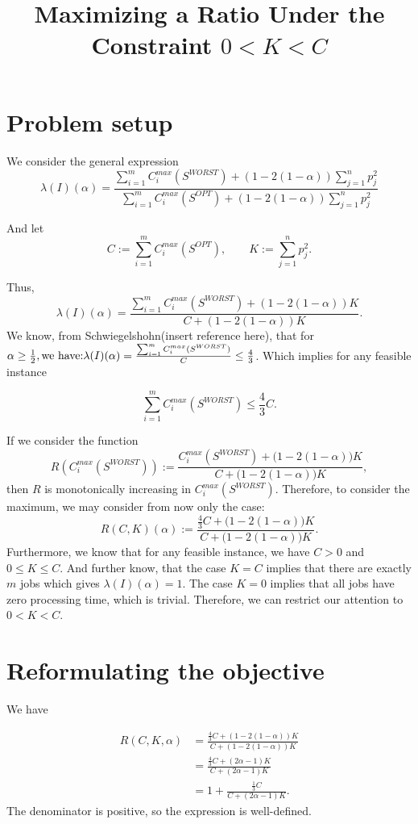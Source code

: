 \documentclass[11pt]{article}
\title{Maximizing a Ratio Under the Constraint $0<K<C$}
\author{}
\begin{document}
\maketitle

\section{Problem setup}


We consider the general expression
\[
    \lambda(I)(\alpha)=\frac{\sum_{i=1}^{m} C^{max}_{i}(S^{WORST})+(1-2(1-\alpha))\sum_{j=1}^{n}p_{j}^{2}}{\sum_{i=1}^{m} C^{max}_{i}(S^{OPT})+(1-2(1-\alpha))\sum_{j=1}^{n}p_{j}^{2}}
\]

And let \[
    C:=\sum_{i=1}^{m} C^{max}_{i}(S^{OPT}), \qquad K:=\sum_{j=1}^{n}p_{j}^{2}.
\]

Thus, 
\[
    \lambda(I)(\alpha)=\frac{\sum_{i=1}^{m} C^{max}_{i}(S^{WORST})+(1-2(1-\alpha))K}{C+(1-2(1-\alpha))K}.
\]
We know, from Schwiegelshohn(insert reference here), that for \(\alpha \ge
\frac12, \space \text{we have:} \space \lambda(I)(\alpha) = \frac{\sum_{i=1}^{m} C^{max}_{i}(S^{WORST})}{C}\le \frac43 \).
Which implies for any feasible instance 

\[
    \sum_{i=1}^{m} C^{max}_{i}(S^{WORST})
    \leq
    \frac43 C.
\]

If we consider the function
 \[
    R(C^{max}_{i}(S^{WORST}))
    :=
    \frac{C^{max}_{i}(S^{WORST}) + \bigl(1-2(1-\alpha)\bigr)K}
         {C + \bigl(1-2(1-\alpha)\bigr)K},
\]
then $R$ is monotonically increasing in $C^{max}_{i}(S^{WORST})$. Therefore, to consider the maximum, we may consider from now only the case: 
\[
    R(C,K)(\alpha)
    :=
    \frac{\frac43 C + \bigl(1-2(1-\alpha)\bigr)K}
         {C + \bigl(1-2(1-\alpha)\bigr)K}.
\]
Furthermore, we know that for any feasible instance, we have $C>0$ and $0 \le K \le C$. And further know, 
that the case $K=C$ implies that there are exactly $m$ jobs which gives $\lambda(I)(\alpha) = 1$. The case 
$K=0$ implies that all jobs have zero processing time, which is trivial.
Therefore, we can restrict our attention to $0<K <C$.


\section{Reformulating the objective}


We have

\begin{align*}
    R(C,K,\alpha)
    &=
    \frac{\frac43 C+(1-2(1-\alpha))K}{C+(1-2(1-\alpha))K} \\
    &=
    \frac{\frac43 C+(2\alpha-1)K}{C+(2\alpha-1)K}\\
    &=
    1+
    \frac{\frac13 C}{C+(2\alpha-1)K}.
\end{align*}
The denominator is positive, so the expression is well-defined.
\end{document}
